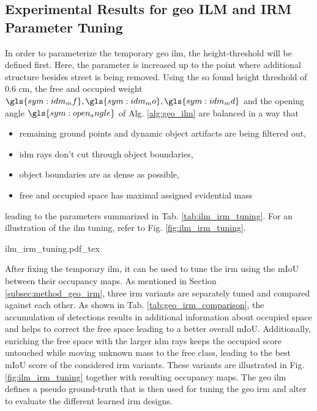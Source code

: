 \subsection{Experimental Results for geo ILM and IRM Parameter Tuning}
\label{subsec:exp_results_params_ilm_irm}
In order to parameterize the temporary geo \gls{ilm}, the height-threshold will be defined first. Here, the parameter is increased up to the point where additional structure besides street is being removed. Using the so found height threshold of 0.6 cm, the free and occupied weight $\gls{sym:idm_mf}, \gls{sym:idm_mo}, \gls{sym:idm_md}$ and the opening angle $\gls{sym:open_angle}$ of Alg. \ref{alg:geo_ilm} are balanced in a way that
\begin{itemize}[noitemsep,nolistsep,topsep=0pt]
	\item remaining ground points and dynamic object artifacts are being filtered out,
	\item \gls{idm} rays don't cut through object boundaries,
	\item object boundaries are as dense as possible,
	\item free and occupied space has maximal assigned evidential mass
\end{itemize}
leading to the parameters summarized in Tab. \ref{tab:ilm_irm_tuning}. For an illustration of the \gls{ilm} tuning, refer to Fig. \ref{fig:ilm_irm_tuning}.
\begin{center}
	{ilm_irm_tuning.pdf_tex}
\end{center}
After fixing the temporary \gls{ilm}, it can be used to tune the \gls{irm} using the mIoU between their occupancy maps. As mentioned in Section \ref{subsec:method_geo_irm}, three \gls{irm} variants are separately tuned and compared against each other. As shown in Tab. \ref{tab:geo_irm_comparison}, the accumulation of detections results in additional information about occupied space and helps to correct the free space leading to a better overall mIoU. Additionally, enriching the free space with the larger \gls{idm} rays keeps the occupied score untouched while moving unknown mass to the free class, leading to the best mIoU score of the considered \gls{irm} variants. These variants are illustrated in Fig. \ref{fig:ilm_irm_tuning} together with resulting occupancy maps. The geo \gls{ilm} defines a pseudo ground-truth that is then used for tuning the geo \gls{irm} and alter to evaluate the different learned \gls{irm} designs.
